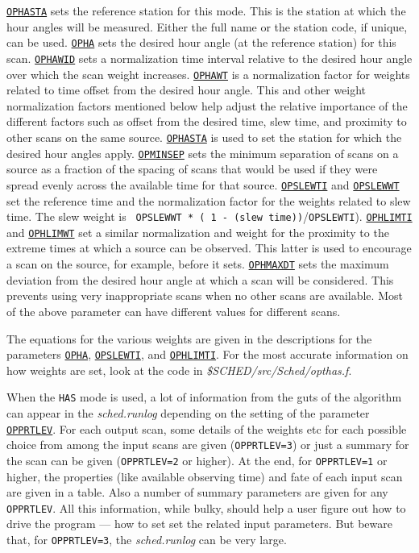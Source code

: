 \documentclass{report}
\begin{document}
\begin{description}
{\hyperref[MP:OPHASTA]{{\tt OPHASTA}}} sets the reference station for
this mode.  This is the station at which the hour angles will be
measured.  Either the full name or the station code, if unique, can be
used.  
{\hyperref[MP:OPHA]{{\tt OPHA}}} sets the desired hour angle (at
the reference station) for this scan.  
{\hyperref[MP:OPHAWID]{{\tt OPHAWID}}}
sets a normalization time interval relative to
the desired hour angle over which the scan weight increases.
{\hyperref[MP:OPHAWT]{{\tt OPHAWT}}} is a normalization factor for
weights related to time offset from the desired hour angle.  This and
other weight normalization factors mentioned below help adjust the
relative importance of the different factors such as offset from the
desired time, slew time, and proximity to other scans on the same
source.  
{\hyperref[MP:OPHASTA]{{\tt OPHASTA}}} is used to set the
station for which the desired hour angles apply.  
{\hyperref[MP:OPMINSEP]{{\tt OPMINSEP}}}
sets the minimum separation of scans on a
source as a fraction of the spacing of scans that would be used if
they were spread evenly across the available time for that source.
{\hyperref[MP:OPSLEWTI]{{\tt OPSLEWTI}}} and 
{\hyperref[MP:OPSLEWWT]{{\tt OPSLEWWT}}}
set the reference time and the normalization
factor for the weights related to slew time.  The slew weight is {\tt
OPSLEWWT * ( 1 - (slew time))}/{\tt OPSLEWTI}).
{\hyperref[MP:OPHLIMTI]{{\tt OPHLIMTI}}} and
{\hyperref[MP:OPHLIMWT]{{\tt OPHLIMWT}}} set a similar normalization and
weight for the proximity to the extreme times at which a source can be
observed.  This latter is used to encourage a scan on the source, for
example, before it sets.  
{\hyperref[MP:OPHMAXDT]{{\tt OPHMAXDT}}} sets
the maximum deviation from the desired hour angle at which a scan will
be considered.  This prevents using very inappropriate scans when no
other scans are available.  Most of the above parameter can have
different values for different scans.

The equations for the various weights are given in the descriptions
for the parameters 
{\hyperref[MP:OPHA]{{\tt OPHA}}}, 
{\hyperref[MP:OPSLEWTI]{{\tt OPSLEWTI}}}, and 
{\hyperref[MP:OPHLIMTI]{{\tt OPHLIMTI}}}.  For
the most accurate information on how weights are set, look at the code
in {\sl \$SCHED/src/Sched/opthas.f}.

When the {\tt HAS} mode is used, a lot of information from the guts of
the algorithm can appear in the {\sl sched.runlog} depending on the
setting of the parameter 
{\hyperref[MP:OPPRTLEV]{{\tt OPPRTLEV}}}.  For
each output scan, some details of the weights etc for each possible
choice from among the input scans are given ({\tt OPPRTLEV=3}) or just
a summary for the scan can be given ({\tt OPPRTLEV=2} or higher).  At
the end, for {\tt OPPRTLEV=1} or higher, the properties (like
available observing time) and fate of each input scan are given in a
table.  Also a number of summary parameters are given for any {\tt
OPPRTLEV}.  All this information, while bulky, should help a user
figure out how to drive the program --- how to set set the related
input parameters.  But beware that, for {\tt OPPRTLEV=3}, the {\sl
sched.runlog} can be very large.


\end{description}
\end{document}
